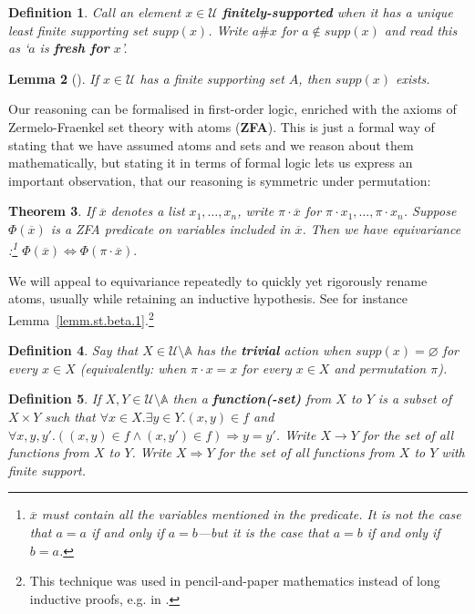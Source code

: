 \documentclass[submission,copyright]{eptcs}
\newtheorem{thrm}{Theorem}[section]
\newtheorem{lemm}[thrm]{Lemma}
\newtheorem{defn}[thrm]{Definition}
\newcommand\vect[1]{\overline{#1}}
\newcommand{\deffont}[1]{\textbf{#1}}
\newcommand{\f}[1]{\ensuremath{\text{$\mathit{#1}$}}}
\newcommand{\supp}{\f{supp}}
\newcommand\fto{{\to}}
\newcommand\limp{{\Rightarrow}}
\newcommand\liff{\Leftrightarrow}
\newcommand{\act}{{\cdot}}
\newcommand\Forall[1]{\forall #1.}
\newcommand\Exists[1]{\exists #1.}
\begin{document}
\begin{defn}
Call an element $x\in\mathcal U$ \deffont{finitely-supported} when it has a unique least finite supporting set $\supp(x)$.
Write $a\#x$ for $a\not\in\supp(x)$ and read this as `$a$ is \deffont{fresh for} $x$'.
\end{defn}

\begin{lemm}[\cite{gabbay:newaas-jv,gabbay:fountl}]
If $x\in\mathcal U$ has a finite supporting set $A$, then $\supp(x)$ exists.
\end{lemm} 






Our reasoning can be formalised in first-order logic, enriched with the axioms of Zermelo-Fraenkel set theory with atoms (\deffont{ZFA}).
This is just a formal way of stating that we have assumed atoms and sets and we reason about them mathematically, but stating it in terms of formal logic lets us express an important observation, that our reasoning is symmetric under permutation: 
\begin{thrm}
\label{thrm.equivar}
If $\vect x$ denotes a list $x_1,\ldots,x_n$, write
$\pi\act \vect x$ for $\pi\act x_1,\ldots,\pi\act x_n$.
Suppose $\Phi(\vect x)$ is a ZFA predicate on variables included in $\vect x$.
Then we have \emph{equivariance} \cite[Section~4]{gabbay:fountl}:\footnote{$\vect x$ must contain \emph{all} the variables mentioned in the predicate.
It is not the case that $a=a$ if and only if $a=b$---but it is the case that $a=b$ if and only if $b=a$.} 
$
\Phi(\vect x) \liff \Phi(\pi\act \vect x) .
$
\end{thrm}
We will appeal to equivariance repeatedly to quickly yet rigorously rename atoms, usually while retaining an inductive hypothesis.
See for instance Lemma~\ref{lemm.st.beta.1}.\footnote{This technique was used in pencil-and-paper mathematics instead of long inductive proofs, e.g. in \cite{gabbay:frelog}.}








\begin{defn}
\label{defn.triv}
Say that $X\in\mathcal U\setminus\mathbb A$ has the \deffont{trivial} action when $\supp(x)=\varnothing$ for every $x\in X$ (equivalently: when $\pi\act x=x$ for every $x\in X$ and permutation $\pi$).
\end{defn}

\begin{defn}
If $X,Y\in\mathcal U\setminus\mathbb A$ then a \deffont{function(-set)} from $X$ to $Y$ is a subset of $X\times Y$ such that $\Forall{x{\in}X}\Exists{y{\in}Y}(x,y)\in f$ and $\Forall{x,y,y'}((x,y)\in f\land (x,y')\in f)\limp y=y'$.
Write $X\fto Y$ for the set of all functions from $X$ to $Y$.
Write $X\limp Y$ for the set of all functions from $X$ to $Y$ with finite support.
\end{defn}
\end{document}
